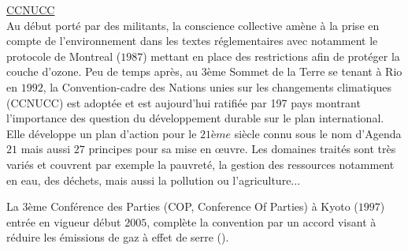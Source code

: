 \href{http://unfccc.int/essential_background/convention/status_of_ratification/items/2631.php}{CCNUCC}\\
Au début porté par des militants, la conscience collective amène à la prise en compte de
l’environnement dans les textes réglementaires avec notamment le protocole de Montreal
($1987$) mettant en place des restrictions afin de protéger la couche d’ozone. Peu de temps
après, au 3ème Sommet de la Terre se tenant à Rio en $1992$, la Convention-cadre des Nations
unies sur les changements climatiques (CCNUCC) est adoptée et est aujourd’hui ratifiée par 197
pays montrant l’importance des question du développement durable sur le plan international.
Elle développe un plan d’action pour le $21ème$ siècle connu sous le nom d’Agenda $21$
mais aussi $27$ principes pour sa mise en œuvre. Les domaines traités sont très variés
et couvrent par exemple la pauvreté, la gestion des ressources notamment en eau, des déchets,
mais aussi la pollution ou l’agriculture...

La 3ème Conférence des Parties (COP, Conference Of Parties) à Kyoto ($1997$) entrée
en vigueur début $2005$, complète la convention par un accord visant à réduire les
émissions de gaz à effet de serre ().


